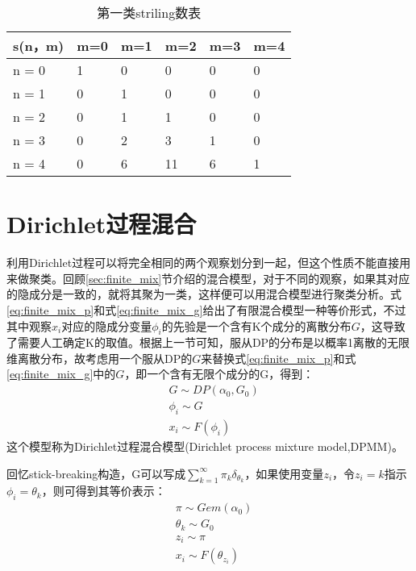 \begin{table}
\begin{center}\small
\begin{tabular}{l|lllll}
s(n，m) &m=0 & m=1 &  m=2 &  m=3 &  m=4 \\ \hline
n = 0 & 1 & 0 & 0 & 0 & 0 \\ 
n = 1 & 0 & 1 & 0 & 0 & 0 \\ 
n = 2 & 0 & 1 & 1 & 0 & 0 \\ 
n = 3 & 0 & 2 & 3 & 1 & 0 \\ 
n = 4 & 0 & 6 & 11 & 6 & 1 \\ 
\end{tabular}
\end{center}
\caption{第一类striling数表}\label{table:stirling_num}
\end{table}

\section{Dirichlet过程混合}\label{sec:dpm}
利用Dirichlet过程可以将完全相同的两个观察划分到一起，但这个性质不能直接用来做聚类。回顾\ref{sec:finite_mix}节介绍的混合模型，对于不同的观察，如果其对应的隐成分是一致的，就将其聚为一类，这样便可以用混合模型进行聚类分析。式\eqref{eq:finite_mix_p}和式\eqref{eq:finite_mix_g}给出了有限混合模型一种等价形式，不过其中观察$x_i$对应的隐成分变量$\phi_i$的先验是一个含有K个成分的离散分布$G$，这导致了需要人工确定K的取值。根据上一节可知，服从DP的分布是以概率1离散的无限维离散分布，故考虑用一个服从DP的$G$来替换式\eqref{eq:finite_mix_p}和式\eqref{eq:finite_mix_g}中的$G$，即一个含有无限个成分的G，得到：
\begin{equation}
\begin{split}
& G \sim DP(\alpha_0,G_0)\\
& \phi_i \sim G\\
& x_i \sim F(\phi_i) 
\end{split}\label{eq:dp_mix}
\end{equation}
这个模型称为Dirichlet过程混合模型(Dirichlet process mixture model,DPMM)\cite{antoniak:74}。

回忆stick-breaking构造，G可以写成$\sum_{k=1}^\infty{\pi_k\delta_{\theta_k}}$，如果使用变量$z_i$，令$z_i=k$指示$\phi_i = \theta_k$，则可得到其等价表示：
\begin{equation}
\begin{split}
& \pi \sim Gem(\alpha_0)\\
& \theta_k \sim G_0\\
& z_i \sim \pi\\
& x_i \sim F(\theta_{z_i}) 
\end{split}
\label{eq:dp_mix_sb}
\end{equation}

